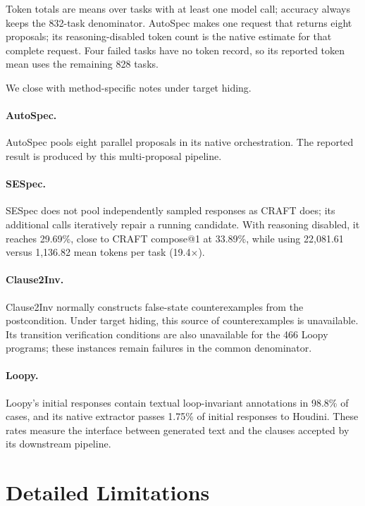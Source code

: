 Token totals are means over tasks with at least one model call; accuracy
always keeps the 832-task denominator.  AutoSpec makes one request that
returns eight proposals; its reasoning-disabled token count is the native estimate
for that complete request.  Four failed tasks have no token record, so its
reported token mean uses the remaining 828 tasks.

We close with method-specific notes under target hiding.

\paragraph{AutoSpec.}
AutoSpec pools eight parallel proposals in its native
orchestration.  The reported result is produced by this multi-proposal
pipeline.

\paragraph{SESpec.}
SESpec does not pool independently sampled responses as CRAFT does; its
additional calls iteratively repair a running candidate.  With reasoning
disabled, it reaches 29.69\%, close to CRAFT compose@1 at 33.89\%, while using
22,081.61 versus 1,136.82 mean tokens per task (19.4\(\times\)).

\paragraph{Clause2Inv.}
Clause2Inv normally constructs false-state counterexamples from the
postcondition.  Under target hiding, this source of counterexamples is
unavailable.  Its transition verification conditions are also unavailable
for the 466 Loopy programs; these instances remain failures in the common
denominator.

\paragraph{Loopy.}
Loopy's initial responses contain textual loop-invariant annotations in
98.8\% of cases, and its native extractor passes 1.75\% of initial responses
to Houdini.  These rates measure the interface between generated text and
the clauses accepted by its downstream pipeline.

\endgroup
\section{Detailed Limitations}
\label{app:limitations}

